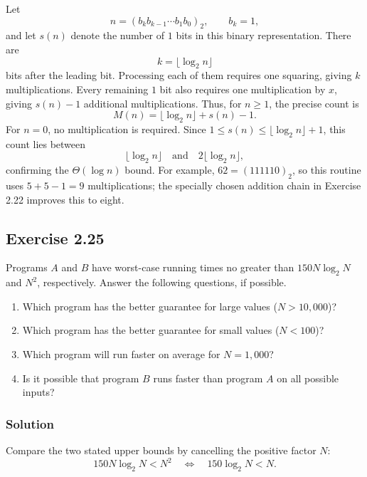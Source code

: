 \documentclass[12pt,a4paper]{article}
\begin{document}
Let
\[
n=(b_kb_{k-1}\cdots b_1b_0)_2,
\qquad b_k=1,
\]
and let $s(n)$ denote the number of $1$ bits in this binary
representation. There are
\[
k=\lfloor\log_2 n\rfloor
\]
bits after the leading bit. Processing each of them requires one
squaring, giving $k$ multiplications. Every remaining $1$ bit also
requires one multiplication by $x$, giving $s(n)-1$ additional
multiplications. Thus, for $n\geq1$, the precise count is
\[
\boxed{M(n)=\lfloor\log_2 n\rfloor+s(n)-1}.
\]
For $n=0$, no multiplication is required. Since
$1\leq s(n)\leq\lfloor\log_2n\rfloor+1$, this count lies between
\[
\lfloor\log_2n\rfloor
\quad\text{and}\quad
2\lfloor\log_2n\rfloor,
\]
confirming the $\Theta(\log n)$ bound. For example, $62=(111110)_2$,
so this routine uses $5+5-1=9$ multiplications; the specially chosen
addition chain in Exercise 2.22 improves this to eight.

\subsection*{\color{sectionnavy}Exercise 2.25}

\noindent
Programs $A$ and $B$ have worst-case running times no greater than
$150N\log_2N$ and $N^2$, respectively. Answer the following questions,
if possible.

\begin{enumerate}
  \renewcommand{\labelenumi}{\alph{enumi}.}
  \item Which program has the better guarantee for large values
  ($N>10{,}000$)?
  \item Which program has the better guarantee for small values
  ($N<100$)?
  \item Which program will run faster on average for $N=1{,}000$?
  \item Is it possible that program $B$ runs faster than program $A$ on
  all possible inputs?
\end{enumerate}

\subsubsection*{\color{sectionnavy}Solution}

Compare the two stated upper bounds by cancelling the positive factor
$N$:
\[
150N\log_2N<N^2
\quad\Longleftrightarrow\quad
150\log_2N<N.
\]
\end{document}
